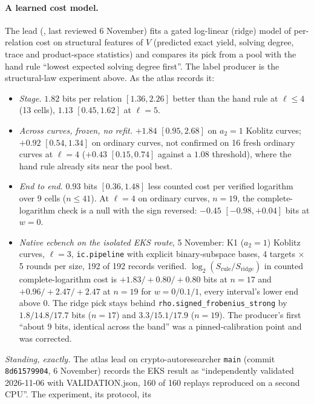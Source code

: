 \paragraph{A learned cost model.} The lead
(,
last reviewed 6 November) fits a gated log-linear (ridge) model of
per-relation cost on structural features of $V$ (predicted exact yield,
solving degree, trace and product-space statistics) and compares its pick
from a pool with the hand rule ``lowest expected solving degree first''. The
label producer is the structural-law experiment above. As the atlas records
it:
\begin{itemize}
\item \emph{Stage.} $1.82$ bits per relation $[1.36,2.26]$ better than the
  hand rule at $\ell\le4$ (13 cells), $1.13$ $[0.45,1.62]$ at $\ell=5$.
\item \emph{Across curves, frozen, no refit.} $+1.84$ $[0.95,2.68]$ on
  $a_2=1$ Koblitz curves; $+0.92$ $[0.54,1.34]$ on ordinary curves, not
  confirmed on 16 fresh ordinary curves at $\ell=4$ ($+0.43$ $[0.15,0.74]$
  against a $1.08$ threshold), where the hand rule already sits near the pool
  best.
\item \emph{End to end.} $0.93$ bits $[0.36,1.48]$ less counted cost per
  verified logarithm over 9 cells ($n\le41$). At $\ell=4$ on ordinary
  curves, $n=19$, the complete-logarithm check is a null with the sign
  reversed: $-0.45$ $[-0.98,+0.04]$ bits at $w=0$.
\item \emph{Native ecbench on the isolated EKS route}, 5 November: K1
  ($a_2=1$) Koblitz curves, $\ell=3$, \texttt{ic.pipeline} with explicit
  binary-subspace bases, 4 targets $\times$ 5 rounds per size, 192 of 192
  records verified. $\log_2(S_{\text{rule}}/S_{\text{ridge}})$ in counted
  complete-logarithm cost is $+1.83/+0.80/+0.80$ bits at $n=17$ and
  $+0.96/+2.47/+2.47$ at $n=19$ for $w=0/0.1/1$, every interval's lower end
  above 0. The ridge pick stays behind \texttt{rho.signed\_frobenius\_strong}
  by $1.8/14.8/17.7$ bits ($n=17$) and $3.3/15.1/17.9$ ($n=19$). The
  producer's first ``about 9 bits, identical across the band'' was a
  pinned-calibration point and was corrected.
\end{itemize}
\emph{Standing, exactly.} The atlas lead on crypto-autoresearcher
\texttt{main} (commit \texttt{8d61579904}, 6 November) records the EKS
result as ``independently validated 2026-11-06 with VALIDATION.json, 160 of
160 replays reproduced on a second CPU''. The experiment, its protocol, its
